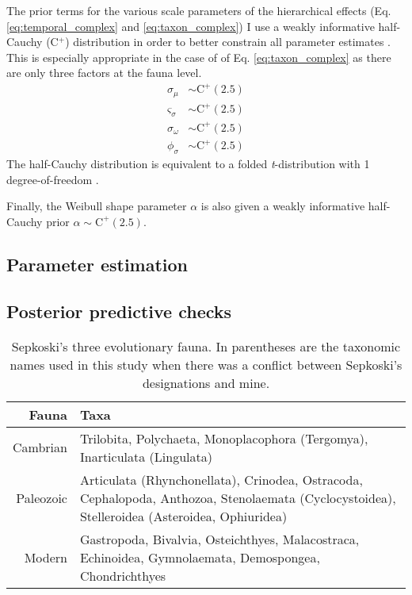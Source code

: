 \documentclass[12pt,letterpaper]{article}
\begin{document}
The prior terms for the various scale parameters of the hierarchical effects (Eq. \ref{eq:temporal_complex} and \ref{eq:taxon_complex}) I use a weakly informative half-Cauchy (C\(^{+}\)) distribution in order to better constrain all parameter estimates \citep{Gelman2013d}. This is especially appropriate in the case of of Eq. \ref{eq:taxon_complex} as there are only three factors at the fauna level. 
\begin{equation}
  \begin{aligned}
    \sigma_{\mu} &\sim \mathrm{C}^{+}(2.5) \\
    \varsigma_{\sigma} &\sim \mathrm{C}^{+}(2.5) \\
    \sigma_{\omega} &\sim \mathrm{C}^{+}(2.5) \\
    \phi_{\sigma} &\sim \mathrm{C}^{+}(2.5)
  \end{aligned}
  \label{eq:scale_priors}
\end{equation}
The half-Cauchy distribution is equivalent to a folded \textit{t}-distribution with 1 degree-of-freedom \citep{Gelman2013d}.

Finally, the Weibull shape parameter \(\alpha\) is also given a weakly informative half-Cauchy prior \(\alpha \sim \mathrm{C}^{+}(2.5)\). 

\subsection{Parameter estimation}



\subsection{Posterior predictive checks}


\begin{table}
  \centering
  \begin{tabular}{r | p{}}
    \hline
    Fauna & Taxa \\
    \hline
    \hline
    Cambrian & Trilobita, Polychaeta, Monoplacophora (Tergomya), Inarticulata (Lingulata)\\[0.1cm]
    Paleozoic & Articulata (Rhynchonellata), Crinodea, Ostracoda, Cephalopoda, Anthozoa, Stenolaemata (Cyclocystoidea), Stelleroidea (Asteroidea, Ophiuridea) \\[0.1cm]
    Modern & Gastropoda, Bivalvia, Osteichthyes, Malacostraca, Echinoidea, Gymnolaemata, Demospongea, Chondrichthyes \\
    \hline
  \end{tabular}
  \caption{Sepkoski's three evolutionary fauna. In parentheses are the taxonomic names used in this study when there was a conflict between Sepkoski's designations and mine.}
  \label{tab:sepkoski}
\end{table}
\end{document}
